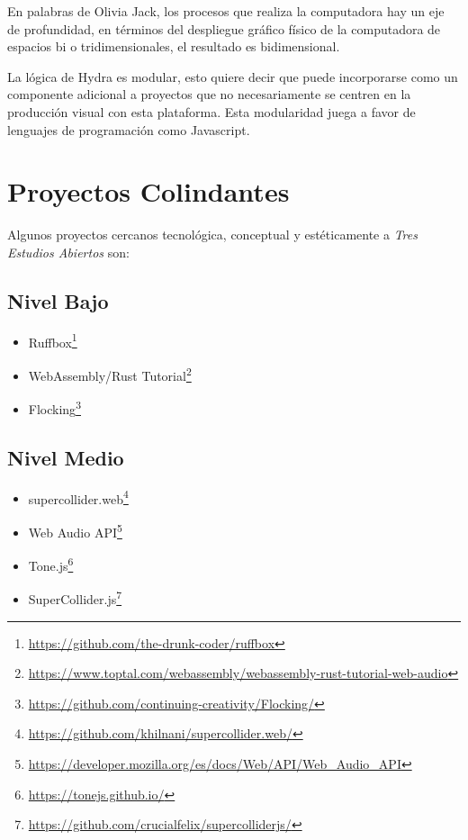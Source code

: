 En palabras de Olivia Jack, los procesos que realiza la computadora hay un eje de profundidad, en términos del despliegue gráfico físico de la computadora de espacios bi o tridimensionales, el resultado es bidimensional.

La lógica de Hydra es modular, esto quiere decir que puede incorporarse como un componente adicional a proyectos que no necesariamente se centren en la producción visual con esta plataforma. Esta modularidad juega a favor de lenguajes de programación como Javascript. 

\section{Proyectos Colindantes}

Algunos proyectos cercanos tecnológica, conceptual y estéticamente a \emph{Tres Estudios Abiertos} son: 

\subsection{Nivel Bajo}

\begin{itemize}

\item Ruffbox\footnote{\url{https://github.com/the-drunk-coder/ruffbox}}
\item WebAssembly/Rust Tutorial\footnote{\url{https://www.toptal.com/webassembly/webassembly-rust-tutorial-web-audio}}
\item Flocking\footnote{\url{https://github.com/continuing-creativity/Flocking/}}
\end{itemize}

\subsection{Nivel Medio}

\begin{itemize}

\item supercollider.web\footnote{\url{https://github.com/khilnani/supercollider.web/}}
\item Web Audio API\footnote{\url{https://developer.mozilla.org/es/docs/Web/API/Web_Audio_API}}
\item Tone.js\footnote{\url{https://tonejs.github.io/}}
\item SuperCollider.js\footnote{\url{https://github.com/crucialfelix/supercolliderjs/}}
  
\end{itemize}

